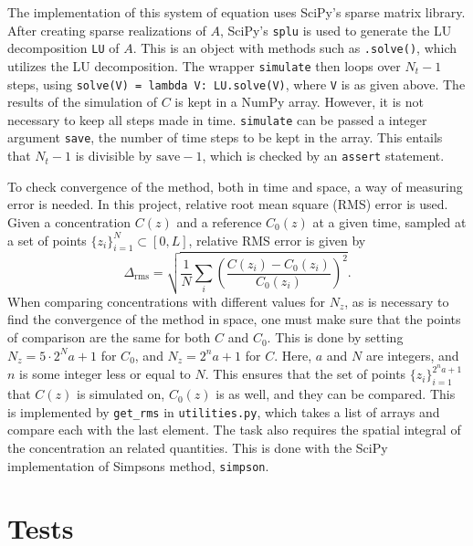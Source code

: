 \documentclass{article}
\begin{document}
    The implementation of this system of equation uses SciPy's sparse matrix library. After creating sparse realizations of $A$, SciPy's \verb|splu| is used to generate the LU decomposition \verb|LU| of $A$. This is an object with methods such as \verb|.solve()|, which utilizes the LU decomposition. The wrapper \verb|simulate| then loops over $N_t-1$ steps, using \verb|solve(V) = lambda V: LU.solve(V)|, where \verb|V| is as given above. The results of the simulation of $C$ is kept in a NumPy array. However, it is not necessary to keep all steps made in time. \verb|simulate| can be passed a integer argument \verb|save|, the number of time steps to be kept in the array. This entails that $N_t-1$ is divisible by $\mathrm{save}-1$, which is checked by an \verb|assert| statement.
    
    To check convergence of the method, both in time and space, a way of measuring error is needed. In this project, relative root mean square (RMS) error is used. Given a concentration $C(z)$ and a reference $C_0(z)$ at a given time, sampled at a set of points $\{z_i\}_{i=1}^N \subset [0, L]$, relative RMS error is given by
    \begin{equation*}
        \Delta_\mathrm{rms} = \sqrt{\frac{1}{N}\sum_i \left(\frac{C(z_i) - C_0(z_i)}{C_0(z_i)}\right)^2}.
    \end{equation*}
    When comparing concentrations with different values for $N_z$, as is necessary to find the convergence of the method in space, one must make sure that the points of comparison are the same for both $C$ and $C_0$. This is done by setting $N_z = 5\cdot 2^Na + 1$ for $C_0$, and $N_z = 2^n a + 1$ for $C$. Here, $a$ and $N$ are integers, and $n$ is some integer less or equal to $N$. This ensures that the set of points $\{z_i\}_{i=1}^{2^na+1}$ that $C(z)$ is simulated on, $C_0(z)$ is as well, and they can be compared. This is implemented by \verb|get_rms| in \verb|utilities.py|, which takes a list of arrays and compare each with the last element. The task also requires the spatial integral of the concentration an related quantities. This is done with the SciPy implementation of Simpsons method, \verb|simpson|. 

    \section*{Tests}
\end{document}
